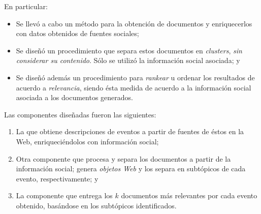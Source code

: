    En particular:

\begin{itemize}
\item Se llevó a cabo un método para la obtención de documentos y
     enriquecerlos con datos obtenidos de fuentes sociales;
\item Se diseñó un procedimiento que separa estos documentos en
     \emph{clusters}, \emph{sin considerar su contenido}. Sólo se utilizó la
     información social asociada; y
\item Se diseñó además un procedimiento para \emph{rankear} u ordenar los
     resultados de acuerdo a \emph{relevancia}, siendo ésta medida de
     acuerdo a la información social asociada a los documentos
     generados.
\end{itemize}

\newpage

   Las componentes diseñadas fueron las siguientes:

\begin{enumerate}
\item La que obtiene descripciones de eventos a partir de fuentes de
      éstos en la Web, enriqueciéndolos con información social;
\item Otra componente que procesa y separa los documentos a partir de
      la información social; genera \emph{objetos Web} y los separa en
      subtópicos de cada evento, respectivamente; y
\item La componente que entrega los $k$ documentos más relevantes por
      cada evento obtenido, basándose en los subtópicos identificados.
\end{enumerate}